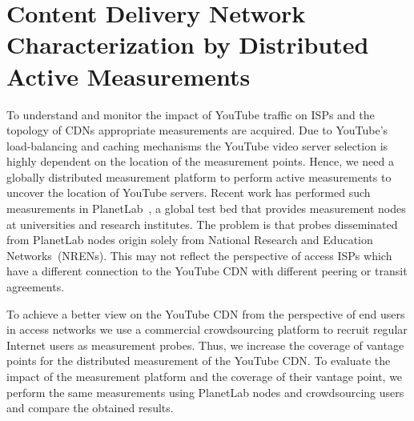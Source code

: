 \section{Content Delivery Network Characterization by Distributed Active Measurements}\label{sec:aslevel:crowd}


To understand and monitor the impact of YouTube traffic on ISPs and the topology of CDNs appropriate measurements are acquired. Due to YouTube's load-balancing and caching mechanisms the YouTube video server selection is highly dependent on the location of the measurement points. Hence, we need a globally distributed measurement platform to perform active measurements to uncover the location of YouTube servers. Recent work \cite{adhikari2012vivisecting,adhikari2011you} has performed such measurements in PlanetLab~\cite{planetlab}, a global test bed that provides measurement nodes at universities and research institutes.
The problem is that probes disseminated from PlanetLab nodes origin solely from National Research and Education Networks~(NRENs). This may not reflect the perspective of access ISPs which have a different connection to the YouTube CDN with different peering or transit agreements.

To achieve a better view on the YouTube CDN from the perspective of end users in access networks we use a commercial crowdsourcing platform to recruit regular Internet users as measurement probes.
Thus, we increase the coverage of vantage points for the distributed measurement of the YouTube CDN.
To evaluate the impact of the measurement platform and the coverage of their vantage point,  we perform the same measurements using PlanetLab nodes and crowdsourcing users and compare the obtained results.

